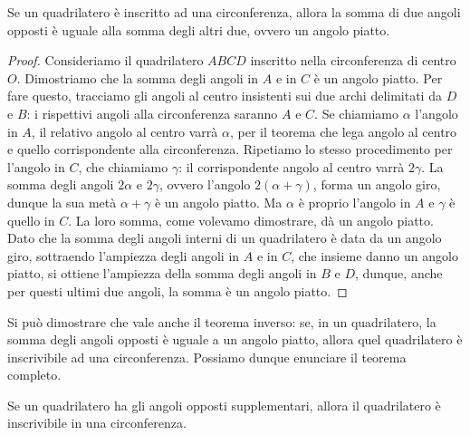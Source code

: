 \begin{teorema}\label{teo:6.5}
Se un quadrilatero è inscritto ad una circonferenza, allora la somma di due angoli opposti è uguale alla somma degli altri due, ovvero un angolo piatto.
\end{teorema}

\begin{figure}[htb]
	\centering
\end{figure}

\begin{proof}
Consideriamo il quadrilatero $ABCD$ inscritto nella circonferenza di centro $O$. Dimostriamo che la somma degli angoli in $A$ e in $C$ è un angolo piatto. Per fare questo, tracciamo gli angoli al centro insistenti sui due archi delimitati da $D$ e $B$: i rispettivi angoli alla circonferenza saranno $A$ e $C$. Se chiamiamo $\alpha$ l'angolo in $A$, il relativo angolo al centro varrà $\alpha$, per il teorema che lega angolo al centro e quello corrispondente alla circonferenza. Ripetiamo lo stesso procedimento per l'angolo in $C$, che chiamiamo $\gamma$: il corrispondente angolo al centro varrà $2\gamma$. La somma degli angoli $2\alpha$ e $2\gamma$, ovvero l'angolo $2(\alpha+\gamma)$, forma un angolo giro, dunque la sua metà $\alpha+\gamma$ è un angolo piatto. Ma $\alpha$ è proprio l'angolo in $A$ e $\gamma$ è quello in $C$. La loro somma, come volevamo dimostrare, dà un angolo piatto. Dato che la somma degli angoli interni di un quadrilatero è data da un angolo giro, sottraendo l'ampiezza degli angoli in $A$ e in $C$, che insieme danno un angolo piatto, si ottiene l'ampiezza della somma degli angoli in $B$ e $D$, dunque, anche per questi ultimi due angoli, la somma è un angolo piatto.
\end{proof}

Si può dimostrare che vale anche il teorema inverso: se, in un quadrilatero, la somma degli angoli opposti è uguale a un angolo piatto, allora quel quadrilatero è inscrivibile ad una circonferenza.
Possiamo dunque enunciare il teorema completo.

\begin{teorema}
Se un quadrilatero ha gli angoli opposti supplementari, allora il quadrilatero è inscrivibile in una circonferenza.
\end{teorema}

\begin{figure}[htb]
	\centering
\end{figure}

